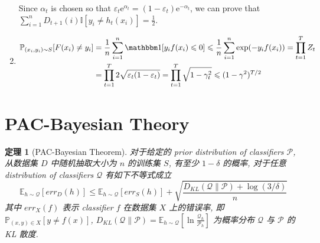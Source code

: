 \documentclass[8pt]{article}
\theoremstyle{compact}
\newtheorem{theorem}{定理}[section]
\def\le{\leqslant}
\def\e{\mathrm{e}}
\begin{document}
\begin{enumerate}
	Since $\alpha_t$ is chosen so that $\varepsilon_t \e^{\alpha_t} = (1 - \varepsilon_t)\e^{-\alpha_t}$, we can prove that $\sum\limits_{i=1}^{n}D_{t+1}(i)\mathbb I[y_i \neq h_t(x_i)] = \frac12$.

	\item \begin{align*}
		\begin{split}
			\mathbb P_{(x_i, y_i)\sim S}[F(x_i) \neq y_i] &= \frac1n \sum_{i=1}^n \mathbbm 1[y_if(x_i) \le 0] \le \frac1n \sum_{i=1}^{n} \exp(-y_if(x_i)) = \prod_{t=1}^T Z_t \\
			&= \prod_{t=1}^T 2\sqrt{\varepsilon_t(1 - \varepsilon_t)} 
			= \prod_{t=1}^T \sqrt{1 - \gamma_t^2} 
			\le (1 - \gamma^2)^{T/2}
		\end{split}
	\end{align*}
\end{enumerate}

\newpage
\section{PAC-Bayesian Theory}
\begin{theorem}[PAC-Bayesian Theorem]
	对于给定的 prior distribution of classifiers $\mathcal P$, 从数据集 $D$ 中随机抽取大小为 $n$ 的训练集 $S$, 有至少 $1 - \delta$ 的概率, 对于任意 distribution of classifiers $\mathcal Q$ 有如下不等式成立
	$$\mathbb E_{h \sim \mathcal Q}[err_D(h)] \le \mathbb E_{h \sim \mathcal Q}[err_S(h)] + \sqrt{\frac{D_{KL}(\mathcal Q \| \mathcal P) + \log(3 / \delta)}{n}}$$
	其中 $err_{X}(f)$ 表示 classifier $f$ 在数据集 $X$ 上的错误率, 即 $\mathbb P_{(x, y) \in X}[y \neq f(x)]$, $D_{KL}(\mathcal Q \| \mathcal P) = \mathbb E_{h \sim \mathcal Q}\left[\ln \frac{\mathcal Q_h}{\mathcal P_h}\right]$ 为概率分布 $\mathcal Q$ 与 $\mathcal P$ 的 KL 散度.
	\label{PAC-Bayesian}
\end{theorem}
\end{document}
